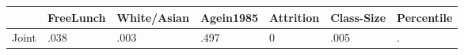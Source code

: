 \begin{table}[htbp]
\begin{tabular}{lllllll} \hline \hline
 & FreeLunch  & White/Asian  & Agein1985  & Attrition  & Class-Size  & Percentile  \\  \hline 
Joint & .038 & .003 & .497 & 0 & .005 & . \\  
\hline \hline \end{tabular}
\end{table}
